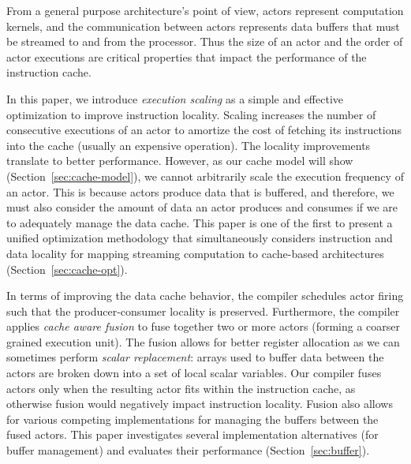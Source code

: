 From a general purpose architecture's point of view, actors represent
computation kernels, and the communication between actors represents
data buffers that must be streamed to and from the processor. Thus
the size of an actor and the order of actor executions are critical
properties that impact the performance of the instruction cache.  

In this paper, we introduce {\it execution scaling} as a simple and
effective optimization to improve instruction locality. Scaling 
increases the number of consecutive executions of an actor to
amortize the cost of fetching its instructions into the cache (usually
an expensive operation). The locality improvements translate to better
performance. However, as our cache model will show
(Section~\ref{sec:cache-model}), we  cannot arbitrarily scale the
execution frequency of an actor. This is because actors produce data
that is buffered, and therefore, we must also consider the amount of
data an actor produces and consumes if we are to adequately manage the
data cache.  This paper is one of the first to present a unified
optimization methodology that simultaneously considers instruction and
data locality for mapping streaming computation to cache-based
architectures (Section~\ref{sec:cache-opt}). 

In terms of improving the data cache behavior, the compiler schedules
actor firing such that the producer-consumer locality is
preserved. Furthermore,  the compiler applies  {\it cache aware fusion}
to fuse together two or more actors (forming a coarser grained
execution unit). The fusion allows for better register allocation as we
can sometimes perform {\it scalar replacement}: arrays used to buffer
data between the actors are broken down into a set of local scalar
variables. Our compiler fuses actors only when the resulting actor
fits within the instruction cache, as otherwise fusion would
negatively impact instruction locality. Fusion also allows for
various competing implementations for managing the buffers between the
fused actors.  This paper investigates several implementation
alternatives (for buffer management) and evaluates their performance
(Section~\ref{sec:buffer}).


